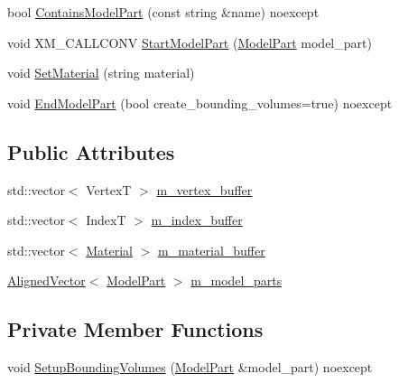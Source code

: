 \begin{DoxyCompactItemize}
\item 
bool \hyperlink{structmage_1_1rendering_1_1_model_output_af90bf18a899dc6a41c7ff20c70c194ce}{Contains\+Model\+Part} (const string \&name) noexcept
\item 
void X\+M\+\_\+\+C\+A\+L\+L\+C\+O\+NV \hyperlink{structmage_1_1rendering_1_1_model_output_adc21b44bf476fa7704f97403c1539eb9}{Start\+Model\+Part} (\hyperlink{structmage_1_1rendering_1_1_model_part}{Model\+Part} model\+\_\+part)
\item 
void \hyperlink{structmage_1_1rendering_1_1_model_output_a54a18cb169cf1e1f1170fdb5fa2afee9}{Set\+Material} (string material)
\item 
void \hyperlink{structmage_1_1rendering_1_1_model_output_ad8f2948cb3ac35f3f25ed68fede20bce}{End\+Model\+Part} (bool create\+\_\+bounding\+\_\+volumes=true) noexcept
\end{DoxyCompactItemize}
\subsection*{Public Attributes}
\begin{DoxyCompactItemize}
\item 
std\+::vector$<$ VertexT $>$ \hyperlink{structmage_1_1rendering_1_1_model_output_a397e9daee731bb89683daa68bd4acd0f}{m\+\_\+vertex\+\_\+buffer}
\item 
std\+::vector$<$ IndexT $>$ \hyperlink{structmage_1_1rendering_1_1_model_output_a0290ea3f7afa5022cedbc9bc316d24e0}{m\+\_\+index\+\_\+buffer}
\item 
std\+::vector$<$ \hyperlink{classmage_1_1rendering_1_1_material}{Material} $>$ \hyperlink{structmage_1_1rendering_1_1_model_output_a7d290dd28d6cef9f33eead6cf30f042f}{m\+\_\+material\+\_\+buffer}
\item 
\hyperlink{namespacemage_a8664bfb5ce2179fc64eae9f82c8a5ba8}{Aligned\+Vector}$<$ \hyperlink{structmage_1_1rendering_1_1_model_part}{Model\+Part} $>$ \hyperlink{structmage_1_1rendering_1_1_model_output_a18da9c959800d0331488351612e25df2}{m\+\_\+model\+\_\+parts}
\end{DoxyCompactItemize}
\subsection*{Private Member Functions}
\begin{DoxyCompactItemize}
\item 
void \hyperlink{structmage_1_1rendering_1_1_model_output_a4b00228713e34d955cb5104c8592f7a0}{Setup\+Bounding\+Volumes} (\hyperlink{structmage_1_1rendering_1_1_model_part}{Model\+Part} \&model\+\_\+part) noexcept
\end{DoxyCompactItemize}



